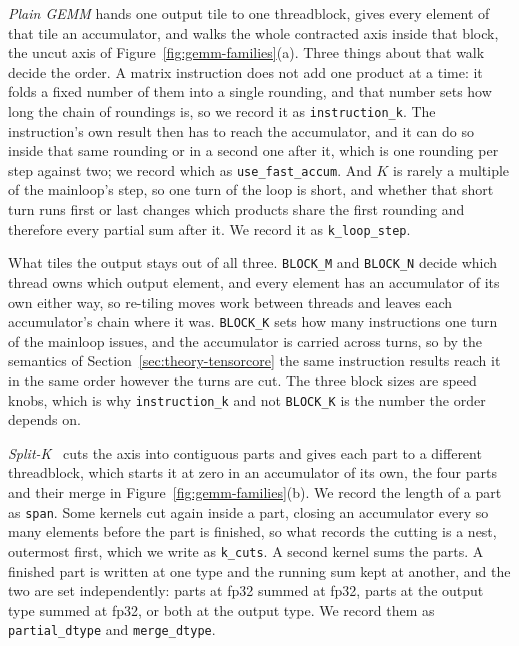 \documentclass[sigplan,nonacm]{acmart}
\begin{document}
\begin{sloppypar}
\textit{Plain GEMM} hands one output tile to one threadblock, gives every
element of that tile an accumulator, and walks the whole contracted axis inside
that block, the uncut axis of Figure~\ref{fig:gemm-families}(a). Three things about that walk decide the order. A matrix
instruction does not add one product at a time: it folds a fixed number of them
into a single rounding, and that number sets how long the chain of roundings is,
so we record it as \texttt{instruction\_k}. The instruction's own result then has
to reach the accumulator, and it can do so inside that same rounding or in a
second one after it, which is one rounding per step against two; we record which
as \texttt{use\_fast\_accum}. And $K$ is rarely a multiple of the mainloop's
step, so one turn of the loop is short, and whether that short turn runs first
or last changes which products share the first rounding and therefore every
partial sum after it. We record it as \texttt{k\_loop\_step}.

What tiles the output stays out of all three. \texttt{BLOCK\_M} and
\texttt{BLOCK\_N} decide which thread owns which output element, and every
element has an accumulator of its own either way, so re-tiling moves work
between threads and leaves each accumulator's chain where it was.
\texttt{BLOCK\_K} sets how many instructions one turn of the mainloop issues,
and the accumulator is carried across turns, so by the semantics of
Section~\ref{sec:theory-tensorcore} the same instruction results reach it in the
same order however the turns are cut. The three block sizes are speed knobs,
which is why \texttt{instruction\_k} and not \texttt{BLOCK\_K} is the number the
order depends on.



\textit{Split-K}~\cite{agarwal1995} cuts the axis into contiguous parts and gives
each part to a different threadblock, which starts it at zero in an accumulator
of its own, the four parts and their merge in Figure~\ref{fig:gemm-families}(b). We record the length of a part as \texttt{span}. Some kernels cut
again inside a part, closing an accumulator every so many elements before the
part is finished, so what records the cutting is a nest, outermost first, which
we write as \texttt{k\_cuts}. A second
kernel sums the parts.
A finished part is written at one
type and the running sum kept at another, and the two are set independently:
parts at fp32 summed at fp32, parts at the output type summed at fp32, or both
at the output type. We record them as \texttt{partial\_dtype} and
\texttt{merge\_dtype}.


\end{sloppypar}
\end{document}
